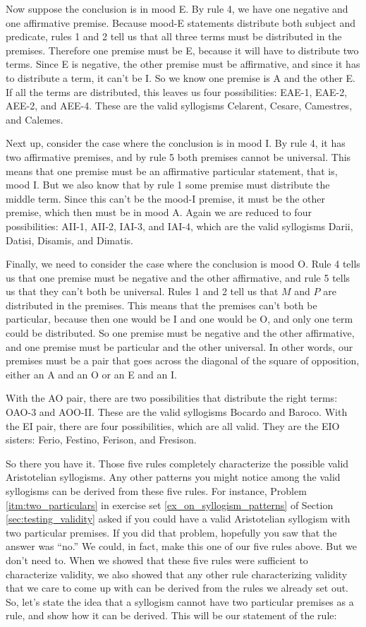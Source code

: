 Now suppose the conclusion is in mood E. By rule 4, we have one negative and one affirmative premise. Because mood-E statements distribute both subject and predicate, rules 1 and 2 tell us that all three terms must be distributed in the premises. Therefore one premise must be E, because it will have to distribute two terms. Since E is negative, the other premise must be affirmative, and since it has to distribute a term, it can't be I. So we know one premise is A and the other E. If all the terms are distributed, this leaves us four possibilities: EAE-1, EAE-2, AEE-2, and AEE-4. These are the valid syllogisms Celarent, Cesare, Camestres, and Calemes.

Next up, consider the case where the conclusion is in mood I. By rule 4, it has two affirmative premises, and by rule 5 both premises cannot be universal. This means that one premise must be an affirmative particular statement, that is, mood I. But we also know that by rule 1 some premise must distribute the middle term. Since this can't be the mood-I premise, it must be the other premise, which then must be in mood A. Again we are reduced to four possibilities: AII-1,  AII-2, IAI-3, and IAI-4, which are the valid syllogisms Darii, Datisi, Disamis, and Dimatis.

Finally, we need to consider the case where the conclusion is mood O. Rule 4 tells us that one premise must be negative and the other affirmative, and rule 5 tells us that they can't both be universal. Rules 1 and 2 tell us that $M$ and $P$ are distributed in the premises. This means that the premises can't both be particular, because then one would be I and one would be O, and only one term could be distributed. So one premise must be negative and the other affirmative, and one premise must be particular and the other universal. In other words, our premises must be a pair that goes across the diagonal of the square of opposition, either an A and an O or an E and an I.

With the AO pair, there are two possibilities that distribute the right terms: OAO-3 and AOO-II. These are the valid syllogisms Bocardo and Baroco. With the EI pair, there are four possibilities, which are all valid. They are the EIO sisters: Ferio, Festino, Ferison, and Fresison.

So there you have it. Those five rules completely characterize the possible valid Aristotelian syllogisms. Any other patterns you might notice among the valid syllogisms can be derived from these five rules. For instance, Problem \ref{itm:two_particulars} in exercise set \ref{ex_on_syllogism_patterns} of Section \ref{sec:testing_validity} asked if you could have a valid Aristotelian syllogism with two particular premises. If you did that problem, hopefully you saw that the answer was ``no.'' We could, in fact, make this one of our five rules above. But we don't need to. When we showed that these five rules were sufficient to characterize validity, we also showed that any other rule characterizing validity that we care to come up with can be derived from the rules we already set out. So, let's state the idea that a syllogism cannot have two particular premises as a rule, and show how it can be derived. This will be our statement of the rule:

